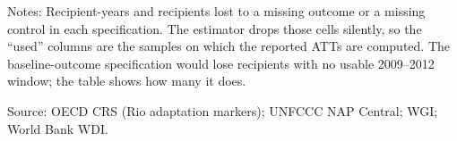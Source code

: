 \begin{table}[H]
\centering
\caption{Listwise-deletion losses in the cohort, anticipation and conditioning specifications}
\label{tab:listwise_losses_13}
\begingroup\small
{}
\endgroup
\par\vspace{4pt}
\begin{minipage}{\linewidth}\footnotesize
Notes: Recipient-years and recipients lost to a missing outcome or a missing control in each specification. The estimator drops those cells silently, so the ``used'' columns are the samples on which the reported ATTs are computed. The baseline-outcome specification would lose recipients with no usable 2009--2012 window; the table shows how many it does.\par
Source: OECD CRS (Rio adaptation markers); UNFCCC NAP Central; WGI; World Bank WDI.
\end{minipage}
\end{table}
